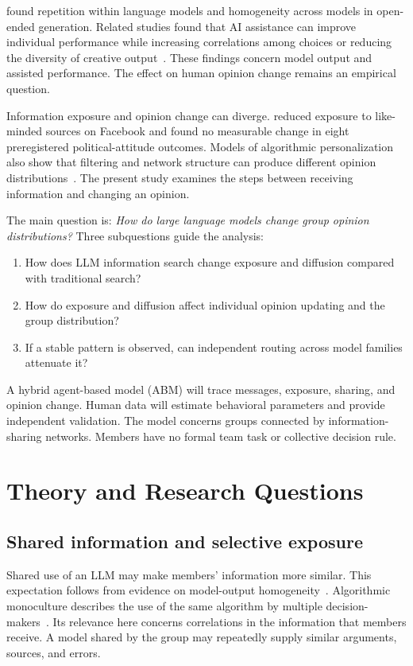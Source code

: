 \documentclass[11pt,a4paper]{article}
\begin{document}
\citet{jiang2025} found repetition within language models and homogeneity across models in open-ended generation. Related studies found that AI assistance can improve individual performance while increasing correlations among choices or reducing the diversity of creative output~\citep{fugener2021,doshi2024}. These findings concern model output and assisted performance. The effect on human opinion change remains an empirical question.

Information exposure and opinion change can diverge. \citet{nyhan2023} reduced exposure to like-minded sources on Facebook and found no measurable change in eight preregistered political-attitude outcomes. Models of algorithmic personalization also show that filtering and network structure can produce different opinion distributions~\citep{perra2019}. The present study examines the steps between receiving information and changing an opinion.

The main question is: \emph{How do large language models change group opinion distributions?} Three subquestions guide the analysis:

\begin{enumerate}
\item How does LLM information search change exposure and diffusion compared with traditional search?
\item How do exposure and diffusion affect individual opinion updating and the group distribution?
\item If a stable pattern is observed, can independent routing across model families attenuate it?
\end{enumerate}

A hybrid agent-based model (ABM) will trace messages, exposure, sharing, and opinion change. Human data will estimate behavioral parameters and provide independent validation. The model concerns groups connected by information-sharing networks. Members have no formal team task or collective decision rule.

\section{Theory and Research Questions}

\subsection{Shared information and selective exposure}

Shared use of an LLM may make members' information more similar. This expectation follows from evidence on model-output homogeneity~\citep{jiang2025}. Algorithmic monoculture describes the use of the same algorithm by multiple decision-makers~\citep{kleinberg2021}. Its relevance here concerns correlations in the information that members receive. A model shared by the group may repeatedly supply similar arguments, sources, and errors.
\end{document}
